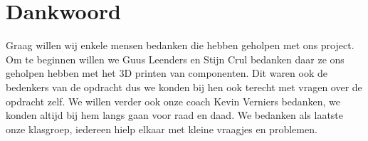 \chapter{Dankwoord}
Graag willen wij enkele mensen bedanken die hebben geholpen met ons project.
Om te beginnen willen we Guus Leenders en Stijn Crul bedanken daar ze ons geholpen hebben met het 3D printen van componenten. Dit waren ook de bedenkers van de opdracht dus we konden bij hen ook terecht met vragen over de opdracht zelf. We willen verder ook onze coach Kevin Verniers bedanken, we konden altijd bij hem langs gaan voor raad en daad. We bedanken als laatste onze klasgroep, iedereen hielp elkaar met kleine vraagjes en problemen.

